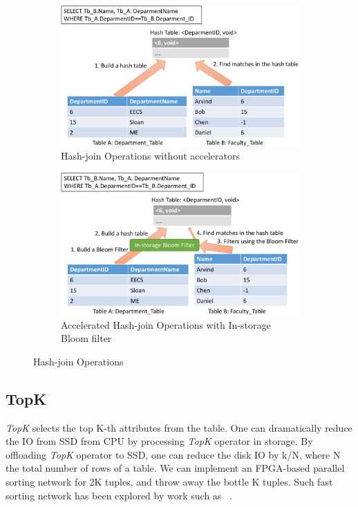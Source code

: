 \documentclass{article}
\newcommand{\topk}{\textit{TopK}\xspace}
\begin{document}
\begin{figure}[!htb]
  \centering
  \begin{subfigure}[t]{0.48\textwidth}
    \includegraphics[width=\textwidth]{figures/hash-join-crop.pdf}
      \caption{Hash-join Operations without accelerators}
      \label{fig:hash-join}
  \end{subfigure}
  \begin{subfigure}[t]{0.48\textwidth}
    \includegraphics[width=\textwidth]{figures/filter-hash-join-crop.pdf}
    \caption{Accelerated Hash-join Operations with In-storage Bloom filter}
    \label{fig:filter-hash-join}
  \end{subfigure}
  \label{fig:try}
  \caption{Hash-join Operations}
\end{figure}

\subsection{TopK}

\topk selects the top K-th attributes from the table.
One can dramatically reduce the IO from SSD from CPU by processing \topk operator in storage.
By offloading \topk operator to SSD, one can reduce the disk IO by k/N, where N the total number of rows of a table.
We can implement an FPGA-based parallel sorting network for 2K tuples, and throw away the bottle K tuples.
Such fast sorting network has been explored by work such as ~\cite{fpga-sort}.
\end{document}
